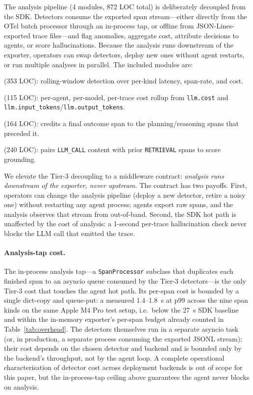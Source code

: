 \documentclass[sigconf,review,anonymous,9pt]{acmart}
\begin{document}
The analysis pipeline (4 modules, 872 LOC total) is deliberately
decoupled from the SDK. Detectors consume the exported span
stream---either directly from the OTel batch processor through an
in-process tap, or offline from JSON-Lines-exported trace files---and
flag anomalies, aggregate cost, attribute decisions to agents, or
score hallucinations. Because the analysis runs downstream of the
exporter, operators can swap detectors, deploy new ones without
agent restarts, or run multiple analyses in parallel. The included
modules are:

\begin{description}[leftmargin=*,nosep,style=nextline]
  \item[\texttt{anomaly\_detection}] (353 LOC): rolling-window
    detection over per-kind latency, span-rate, and cost.
  \item[\texttt{cost\_aggregation}] (115 LOC): per-agent, per-model,
    per-trace cost rollup from \texttt{llm.cost} and
    \texttt{llm.input\_tokens}/\texttt{llm.output\_tokens}.
  \item[\texttt{decision\_attribution}] (164 LOC): credits a final
    outcome span to the planning/reasoning spans that preceded it.
  \item[\texttt{hallucination\_tracing}] (240 LOC): pairs
    \texttt{LLM\_CALL} content with prior \texttt{RETRIEVAL} spans
    to score grounding.
\end{description}

We elevate the Tier-3 decoupling to a middleware contract:
\emph{analysis runs downstream of the exporter, never upstream.}
The contract has two payoffs. First, operators can change the
analysis pipeline (deploy a new detector, retire a noisy one) without
restarting any agent process; agents export raw spans, and the
analysis observes that stream from out-of-band. Second, the SDK hot
path is unaffected by the cost of analysis: a 1-second per-trace
hallucination check never blocks the LLM call that emitted the trace.

\paragraph{Analysis-tap cost.}
The in-process analysis tap---a \texttt{SpanProcessor} subclass that
duplicates each finished span to an asyncio queue consumed by the
Tier-3 detectors---is the only Tier-3 cost that touches the agent
hot path. Its per-span cost is bounded by a single dict-copy and
queue-put: a measured 1.4--1.8~\textmu s at p99 across the nine span
kinds on the same Apple M4 Pro test setup, i.e.\ below the 27~\textmu s
SDK baseline and within the in-memory exporter's per-span budget
already counted in Table~\ref{tab:overhead}. The detectors
themselves run in a separate asyncio task (or, in production, a
separate process consuming the exported JSONL stream); their cost
depends on the chosen detector and backend and is bounded only by
the backend's throughput, not by the agent loop. A complete
operational characterisation of detector cost across deployment
backends is out of scope for this paper, but the in-process-tap
ceiling above guarantees the agent never blocks on analysis.
\end{document}
